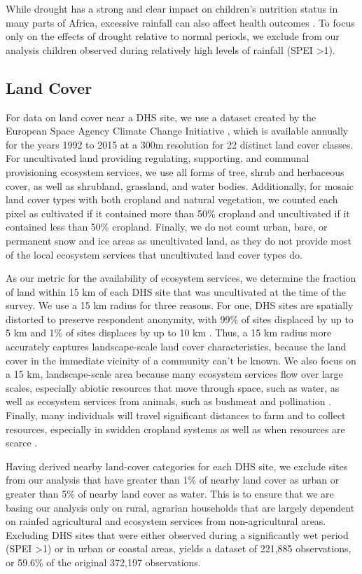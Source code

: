 \documentclass{article}
\begin{document}
While drought has a strong and clear impact on children's nutrition status in many parts of Africa, excessive rainfall can also affect health outcomes \cite{Cooper2019Mapping}.  To focus only on the effects of drought relative to normal periods, we exclude from our analysis children observed during relatively high levels of rainfall (SPEI \textgreater 1).

\subsection{Land Cover}
For data on land cover near a DHS site, we use a dataset created by the European Space Agency Climate Change Initiative \cite{Defourny2017}, which is available annually for the years 1992 to 2015 at a 300m resolution for 22 distinct land cover classes.  For uncultivated land providing regulating, supporting, and communal provisioning ecosystem services, we use all forms of tree, shrub and herbaceous cover, as well as shrubland, grassland, and water bodies.  Additionally, for mosaic land cover types with both cropland and natural vegetation, we counted each pixel as cultivated if it contained more than 50\% cropland and uncultivated if it contained less than 50\% cropland.  Finally, we do not count urban, bare, or permanent snow and ice areas as uncultivated land, as they do not provide most of the local ecosystem services that uncultivated land cover types do.

As our metric for the availability of ecosystem services, we determine the fraction of land within 15 km of each DHS site that was uncultivated at the time of the survey.  We use a 15 km radius for three reasons.  For one, DHS sites are spatially distorted to preserve respondent anonymity, with 99\% of sites displaced by up to 5 km and 1\% of sites displaces by up to 10 km \cite{Grace2012}.  Thus, a 15 km radius more accurately captures landscape-scale land cover characteristics, because the land cover in the immediate vicinity of a community can't be known.  We also focus on a 15 km, landscape-scale area because many ecosystem services flow over large scales, especially abiotic resources that move through space, such as water, as well as ecosystem services from animals, such as bushmeat and pollination \cite{Lopez-Hoffman2010}.  Finally, many individuals will travel significant distances to farm and to collect resources, especially in swidden cropland systems as well as when resources are scarce \cite{Felardo2016, Arku2010}.

Having derived nearby land-cover categories for each DHS site, we exclude sites from our analysis that have greater than 1\% of nearby land cover as urban or greater than 5\% of nearby land cover as water.  This is to ensure that we are basing our analysis only on rural, agrarian households that are largely dependent on rainfed agricultural and ecosystem services from non-agricultural areas.  Excluding DHS sites that were either observed during a significantly wet period (SPEI \textgreater 1) or in urban or coastal areas, yields a dataset of 221,885 observations, or 59.6\% of the original 372,197 observations.
\end{document}
